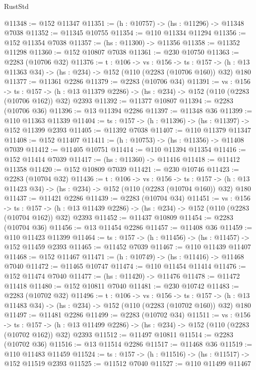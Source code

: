 \begin{lexlean}{RustStd}
\begin{coremodule}
@11348 := @152 @11347
@11351 := (h : @10757) -> (hs : @11296) -> @11348 @7038
@11352 := @11345 @10755
@11354 := @110 @11334 @11294
@11356 := @152 @11354 @7038
@11357 := (hs : @11300) -> @11356
@11358 := @11352 @11298
@11360 := @152 @10807 @7038
@11361 := @230 @10750
@11363 := @2283 (@10706 @32)
@11376 := {t : @106} ->
  {vs : @156} ->
  {ts : @157} -> (h : @13 @11363 @34) -> (hs : @234) -> @152 (@110 (@2283 (@10706 @160)) @32) @180
@11377 := @11361 @2286
@11379 := @2283 (@10706 @34)
@11391 := {vs : @156} ->
  {ts : @157} ->
  (h : @13 @11379 @2286) -> (hs : @234) -> @152 (@110 (@2283 (@10706 @162)) @32) @2393
@11392 := @11377 @10807
@11394 := @2283 (@10706 @36)
@11396 := @13 @11394 @2286
@11397 := @11348 @36
@11399 := @110 @11363 @11339
@11404 := {ts : @157} -> (h : @11396) -> (hs : @11397) -> @152 @11399 @2393
@11405 := @11392 @7038
@11407 := @110 @11379 @11347
@11408 := @152 @11407
@11411 := (h : @10753) -> (hs : @11356) -> @11408 @7039
@11412 := @11405 @10751
@11414 := @110 @11394 @11354
@11416 := @152 @11414 @7039
@11417 := (hs : @11360) -> @11416
@11418 := @11412 @11358
@11420 := @152 @10809 @7039
@11421 := @230 @10746
@11423 := @2283 (@10704 @32)
@11436 := {t : @106} ->
  {vs : @156} ->
  {ts : @157} -> (h : @13 @11423 @34) -> (hs : @234) -> @152 (@110 (@2283 (@10704 @160)) @32) @180
@11437 := @11421 @2286
@11439 := @2283 (@10704 @34)
@11451 := {vs : @156} ->
  {ts : @157} ->
  (h : @13 @11439 @2286) -> (hs : @234) -> @152 (@110 (@2283 (@10704 @162)) @32) @2393
@11452 := @11437 @10809
@11454 := @2283 (@10704 @36)
@11456 := @13 @11454 @2286
@11457 := @11408 @36
@11459 := @110 @11423 @11399
@11464 := {ts : @157} -> (h : @11456) -> (hs : @11457) -> @152 @11459 @2393
@11465 := @11452 @7039
@11467 := @110 @11439 @11407
@11468 := @152 @11467
@11471 := (h : @10749) -> (hs : @11416) -> @11468 @7040
@11472 := @11465 @10747
@11474 := @110 @11454 @11414
@11476 := @152 @11474 @7040
@11477 := (hs : @11420) -> @11476
@11478 := @11472 @11418
@11480 := @152 @10811 @7040
@11481 := @230 @10742
@11483 := @2283 (@10702 @32)
@11496 := {t : @106} ->
  {vs : @156} ->
  {ts : @157} -> (h : @13 @11483 @34) -> (hs : @234) -> @152 (@110 (@2283 (@10702 @160)) @32) @180
@11497 := @11481 @2286
@11499 := @2283 (@10702 @34)
@11511 := {vs : @156} ->
  {ts : @157} ->
  (h : @13 @11499 @2286) -> (hs : @234) -> @152 (@110 (@2283 (@10702 @162)) @32) @2393
@11512 := @11497 @10811
@11514 := @2283 (@10702 @36)
@11516 := @13 @11514 @2286
@11517 := @11468 @36
@11519 := @110 @11483 @11459
@11524 := {ts : @157} -> (h : @11516) -> (hs : @11517) -> @152 @11519 @2393
@11525 := @11512 @7040
@11527 := @110 @11499 @11467

\end{coremodule}
\end{lexlean}
